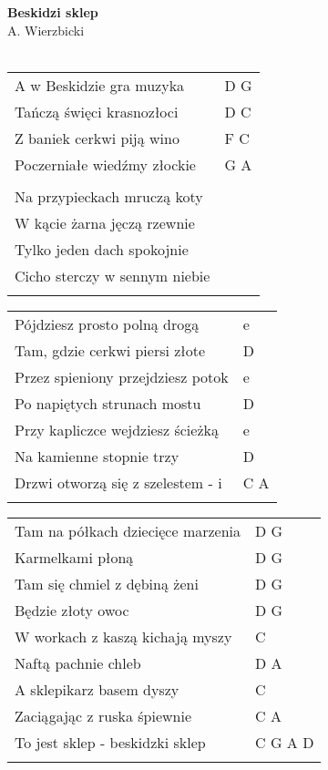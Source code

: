 \documentclass[a5paper]{article}
\begin{document}


\noindent
\fontsize{12pt}{15pt}\selectfont
\textbf{Beskidzi sklep} \\
\fontsize{8pt}{10pt}\selectfont
A. Wierzbicki \\ \\
\fontsize{10pt}{12pt}\selectfont
{}
\begin{tabular}{@{}p{8.5cm}p{3cm}@{}}
A w Beskidzie gra muzyka & D G \\
Tańczą święci krasnozłoci & D C \\
Z baniek cerkwi piją wino & F C \\
Poczerniałe wiedźmy złockie & G A \\ \\
 
Na przypieckach mruczą koty \\
W kącie żarna jęczą rzewnie \\
Tylko jeden dach spokojnie \\
Cicho sterczy w sennym niebie \\ \\
\end{tabular}

\noindent
\begin{tabular}{@{}p{7.5cm}p{3cm}@{}} 
Pójdziesz prosto polną drogą & e \\
Tam, gdzie cerkwi piersi złote & D \\
Przez spieniony przejdziesz potok & e \\
Po napiętych strunach mostu & D \\
Przy kapliczce wejdziesz ścieżką & e \\
Na kamienne stopnie trzy & D \\
Drzwi otworzą się z szelestem - i & C A \\ \\
\end{tabular}

\noindent
\begin{tabular}{@{}p{6.5cm}p{3cm}@{}}
Tam na półkach dziecięce marzenia & D G \\
Karmelkami płoną & D G \\
Tam się chmiel z dębiną żeni & D G \\
Będzie złoty owoc & D G \\
W workach z kaszą kichają myszy & C \\
Naftą pachnie chleb & D A \\
A sklepikarz basem dyszy & C \\
Zaciągając z ruska śpiewnie & C A \\
To jest sklep - beskidzki sklep & C G A D \\ \\
\end{tabular}
\end{document}
